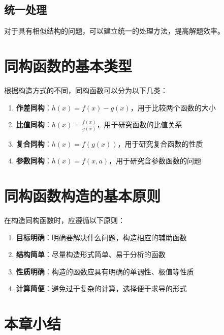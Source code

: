 \documentclass[a4paper,11pt]{ctexrep}
\theoremstyle{definition}
\begin{document}
\subsection{统一处理}

对于具有相似结构的问题，可以建立统一的处理方法，提高解题效率。

\section{同构函数的基本类型}

根据构造方式的不同，同构函数可以分为以下几类：

\begin{definitionbox}[同构函数的基本类型]
\begin{enumerate}
    \item \textbf{作差同构}：$h(x) = f(x) - g(x)$，用于比较两个函数的大小
    \item \textbf{比值同构}：$h(x) = \frac{f(x)}{g(x)}$，用于研究函数的比值关系
    \item \textbf{复合同构}：$h(x) = f(g(x))$，用于研究复合函数的性质
    \item \textbf{参数同构}：$h(x) = f(x, a)$，用于研究含参数函数的问题
\end{enumerate}
\end{definitionbox}

\section{同构函数构造的基本原则}

在构造同构函数时，应遵循以下原则：

\begin{tipbox}[构造原则]
\begin{enumerate}
    \item \textbf{目标明确}：明确要解决什么问题，构造相应的辅助函数
    \item \textbf{结构简单}：尽量构造形式简单、易于分析的函数
    \item \textbf{性质明确}：构造的函数应具有明确的单调性、极值等性质
    \item \textbf{计算简便}：避免过于复杂的计算，选择便于求导的形式
\end{enumerate}
\end{tipbox}

\section{本章小结}
\end{document}
